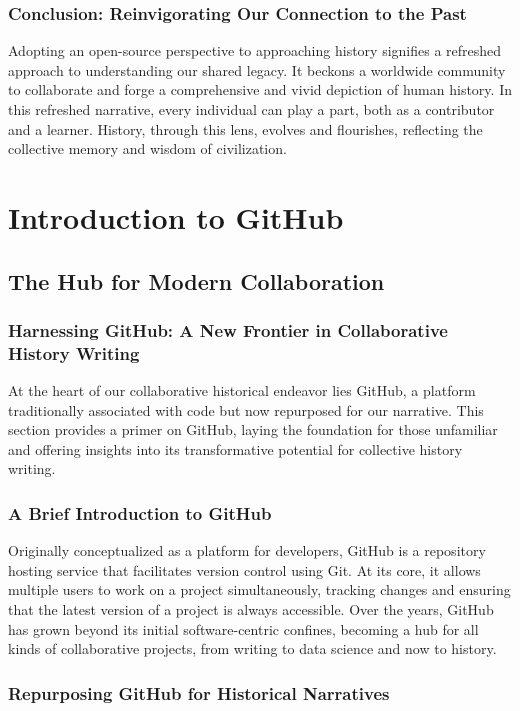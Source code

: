 \documentclass{book}
\begin{document}
\subsection*{Conclusion: Reinvigorating Our Connection to the Past}
Adopting an open-source perspective to approaching history signifies a refreshed approach to understanding our shared legacy. It beckons a worldwide community to collaborate and forge a comprehensive and vivid depiction of human history. In this refreshed narrative, every individual can play a part, both as a contributor and a learner. History, through this lens, evolves and flourishes, reflecting the collective memory and wisdom of civilization.

\chapter{Introduction to GitHub}
\section*{The Hub for Modern Collaboration}
\subsection*{Harnessing GitHub: A New Frontier in Collaborative History Writing}
At the heart of our collaborative historical endeavor lies GitHub, a platform traditionally associated with code but now repurposed for our narrative. This section provides a primer on GitHub, laying the foundation for those unfamiliar and offering insights into its transformative potential for collective history writing.

\subsection*{A Brief Introduction to GitHub}
Originally conceptualized as a platform for developers, GitHub is a repository hosting service that facilitates version control using Git. At its core, it allows multiple users to work on a project simultaneously, tracking changes and ensuring that the latest version of a project is always accessible. Over the years, GitHub has grown beyond its initial software-centric confines, becoming a hub for all kinds of collaborative projects, from writing to data science and now to history.

\subsection*{Repurposing GitHub for Historical Narratives}
\end{document}

